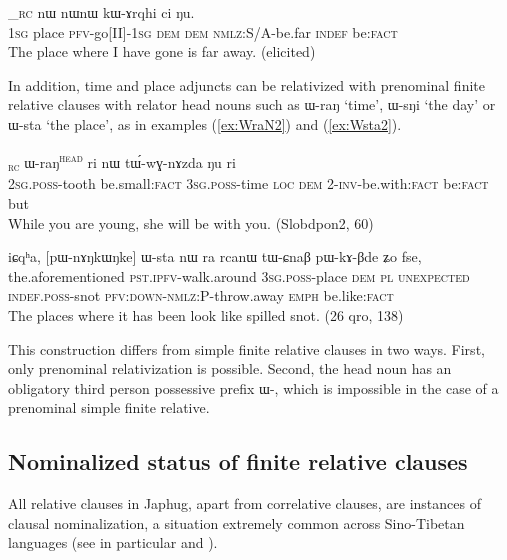 \documentclass[oldfontcommands,oneside,a4paper,11pt]{article}
\newcommand{\ipa}[1]{{\phon #1}} %
\newcommand{\topic}{\textsc{dem}}
\newcommand{\tete}{\textsuperscript{\textsc{head}}}
\newcommand{\rc}{\textsubscript{\textsc{rc}}}
\newcommand{\refb}[1]{(\ref{#1})}
\begin{document}
     \begin{exe}
   \ex \label{ex:jaria.nW}
 \gll
[\ipa{aʑo}  	\ipa{sɤtɕha}\tete{}  	\ipa{jɤ-ari-a}]_{\textsc{rc}}  	\ipa{nɯ}  	\ipa{nɯnɯ}  	\ipa{kɯ-ɤrqhi}  	\ipa{ci}  	\ipa{ŋu.}  \\
\textsc{1sg} place \textsc{pfv}-go[II]-\textsc{1sg} \textsc{dem} \textsc{dem} \textsc{nmlz}:S/A-be.far \textsc{indef} be:\textsc{fact} \\
\glt The place where I have gone is far away. (elicited)
\end{exe}


In addition, time and place adjuncts can be relativized with prenominal finite relative clauses with  relator head nouns such as \ipa{ɯ-raŋ} `time', \ipa{ɯ-sŋi} `the day' or \ipa{ɯ-sta} `the place', as in examples  \refb{ex:WraN2} and \refb{ex:Wsta2}.

\begin{exe}
   \ex \label{ex:WraN2}
 \gll [\ipa{nɤ-ɕɣa}   	\ipa{xtɕi}]\rc{}   	\ipa{ɯ-raŋ}\tete{}   	\ipa{ri}   	\ipa{nɯ}   	\ipa{tɯ́-wɣ-nɤzda}   	\ipa{ŋu}   	\ipa{ri}   \\
 \textsc{2sg.poss}-tooth be.small:\textsc{fact} \textsc{3sg.poss}-time \textsc{loc} \topic{} 2-\textsc{inv}-be.with:\textsc{fact} be:\textsc{fact} but \\
\glt While you are young, she will be with you. (Slobdpon2, 60)
\end{exe}

\begin{exe}
   \ex \label{ex:Wsta2}
 \gll
\ipa{iɕqʰa,}  	[\ipa{pɯ-nɤŋkɯŋke}]  	\ipa{ɯ-sta}  	\ipa{nɯ} \ipa{ra} \ipa{rcanɯ} 	\ipa{tɯ-ɕnaβ}  	\ipa{pɯ-kɤ-βde}  	\ipa{ʑo}  	\ipa{fse,}  \\
the.aforementioned \textsc{pst.ipfv}-walk.around \textsc{3sg.poss}-place \topic{} \textsc{pl} \textsc{unexpected} \textsc{indef.poss}-snot \textsc{pfv:down-nmlz:P}-throw.away \textsc{emph} be.like:\textsc{fact} \\
\glt The places where it has been look like spilled snot. (26 qro, 138)
\end{exe}

This construction differs from simple finite relative clauses in two ways. First, only prenominal relativization is possible. Second, the  head noun has an obligatory third person possessive prefix \ipa{ɯ-}, which is impossible in the case of a prenominal simple finite relative.

\subsection{Nominalized status of finite relative clauses}
All relative clauses in Japhug, apart from correlative clauses, are instances of clausal nominalization, a situation extremely common across Sino-Tibetan languages (see in particular \citealt{genetti08nmlz} and \citealt{bickel99nmlz}).
\end{document}
